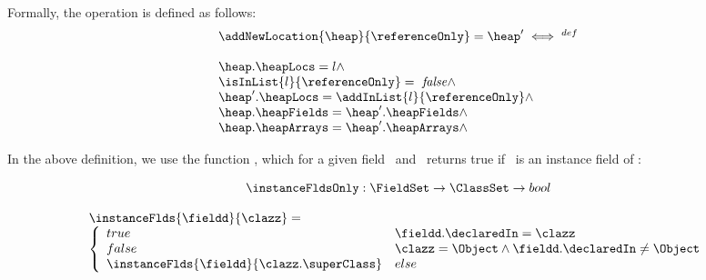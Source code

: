  Formally, the operation is defined as follows: 
 $$ \begin{array}{l}
           \addNewLocation{\heap}{\referenceOnly} = \heap' \iff^{def} \\
	      \\
              \heap.\heapLocs = l \wedge \\
   	      \isInList{l}{\referenceOnly} = \mbox{ \rm \textit{false}} \wedge \\
	      \heap'.\heapLocs = \addInList{l}{\referenceOnly}  \wedge \\ 
	      \heap.\heapFields = \heap'.\heapFields \wedge \\
	      \heap.\heapArrays = \heap'.\heapArrays \wedge \\
    \end{array}$$ 

In the above definition, we use the function \instanceFldsOnly, which for a given field \fieldd \ and \clazz \ returns true if \fieldd \ is
an instance field of \clazz: 

$$
 \instanceFldsOnly : \FieldSet   \rightarrow \ClassSet \rightarrow bool 
$$

$$
 \begin{array}{l}
       \instanceFlds{\fieldd}{\clazz } = \\
       \left\{\begin{array}{ll}
                    true  & \fieldd.\declaredIn = \clazz \\
		    false & \clazz = \Object \wedge \fieldd.\declaredIn \neq \Object \\
		    \instanceFlds{\fieldd}{\clazz.\superClass} & else
       \end{array}\right.
 \end{array}
$$



